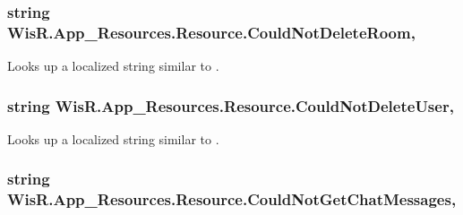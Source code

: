 \subsubsection[{Could\+Not\+Delete\+Room}]{\setlength{\rightskip}{0pt plus 5cm}string Wis\+R.\+App\+\_\+\+Resources.\+Resource.\+Could\+Not\+Delete\+Room\hspace{0.3cm}{\ttfamily [static]}, {\ttfamily [get]}}\label{class_wis_r_1_1_app___resources_1_1_resource_a36bd047d6103bfcd6e8349b0d59a05a4}


Looks up a localized string similar to . 

\hypertarget{class_wis_r_1_1_app___resources_1_1_resource_a09835ac5eb60ef0eea1578e43ecdefbc}{}
\subsubsection[{Could\+Not\+Delete\+User}]{\setlength{\rightskip}{0pt plus 5cm}string Wis\+R.\+App\+\_\+\+Resources.\+Resource.\+Could\+Not\+Delete\+User\hspace{0.3cm}{\ttfamily [static]}, {\ttfamily [get]}}\label{class_wis_r_1_1_app___resources_1_1_resource_a09835ac5eb60ef0eea1578e43ecdefbc}


Looks up a localized string similar to . 

\hypertarget{class_wis_r_1_1_app___resources_1_1_resource_a60be876b3c0f2a4d2f485bae5fa6cc84}{}
\subsubsection[{Could\+Not\+Get\+Chat\+Messages}]{\setlength{\rightskip}{0pt plus 5cm}string Wis\+R.\+App\+\_\+\+Resources.\+Resource.\+Could\+Not\+Get\+Chat\+Messages\hspace{0.3cm}{\ttfamily [static]}, {\ttfamily [get]}}\label{class_wis_r_1_1_app___resources_1_1_resource_a60be876b3c0f2a4d2f485bae5fa6cc84}



